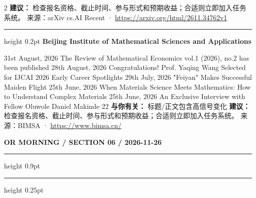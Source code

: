 \documentclass[10.5pt]{ctexart}
\begin{document}
\begin{multicols}{2}
\textbf{建议：} 检查报名资格、截止时间、参与形式和预期收益；合适则立即加入任务系统。
{\footnotesize\color{ormuted} 来源：arXiv cs.AI Recent · \url{https://arxiv.org/html/2611.34762v1}}
\vspace{2mm}
\hrule height 0.2pt
\vspace{2mm}
{\large\bfseries Beijing Institute of Mathematical Sciences and Applications}\par
31st August, 2026 The Review of Mathematical Economics vol.1 (2026), no.2 has been published 28th August, 2026 Congratulations! Prof. Yaqing Wang Selected for IJCAI 2026 Early Career Spotlights 29th July, 2026 "Feiyan" Makes Successful Maiden Flight 25th June, 2026 When Materials Science Meets Mathematics: How to Understand Complex Materials 25th June, 2026 An Exclusive Interview with Fellow Oluwole Daniel Makinde 22
\textbf{与你有关：} 标题/正文包含高信号变化
\textbf{建议：} 检查报名资格、截止时间、参与形式和预期收益；合适则立即加入任务系统。
{\footnotesize\color{ormuted} 来源：BIMSA · \url{https://www.bimsa.cn/}}
\end{multicols}
\newpage
{\small\bfseries OR MORNING / SECTION 06 / 2026-11-26}
\vspace{2mm}
\hrule height 0.9pt
\vspace{1.5mm}
\hrule height 0.25pt
\vspace{4mm}
\end{document}
